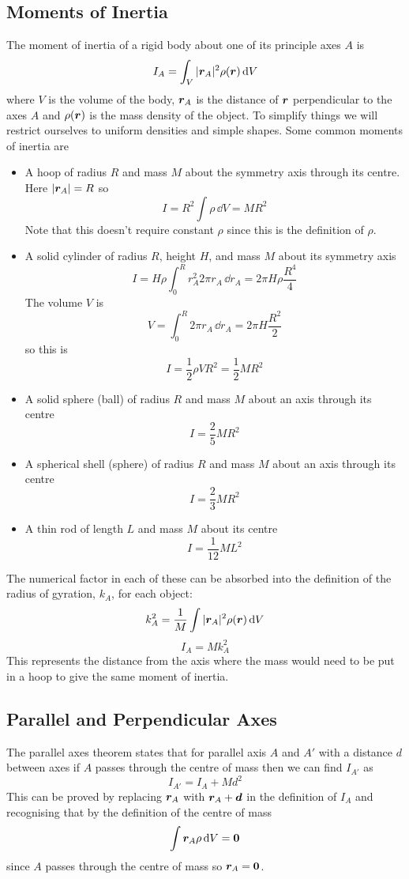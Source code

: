 \documentclass{article}
\begin{document}
    \subsection{Moments of Inertia}
    The moment of inertia of a rigid body about one of its principle axes \(A\) is
    \[I_A = \int_V|\bm{r}_A|^2\rho(\bm{r})\,\dd V\]
    where \(V\) is the volume of the body, \(\bm{r}_A\) is the distance of \(\bm{r}\) perpendicular to the axes \(A\) and \(\rho(\bm{r})\) is the mass density of the object.
    To simplify things we will restrict ourselves to uniform densities and simple shapes.
    Some common moments of inertia are
    \begin{itemize}
        \item A hoop of radius \(R\) and mass \(M\) about the symmetry axis through its centre.
        Here \(|\bm{r}_A| = R\) so
        \[I = R^2\int\rho\,\dd V = MR^2\]
        Note that this doesn't require constant \(\rho\) since this is the definition of \(\rho\).
        
        \item A solid cylinder of radius \(R\), height \(H\), and mass \(M\) about its symmetry axis
        \[I = H\rho\int_0^Rr^2_A2\pi r_A\,\dd r_A = 2\pi H\rho\frac{R^4}{4}\]
        The volume \(V\) is
        \[V = \int_0^R2\pi r_A\,\dd r_A = 2\pi H\frac{R^2}{2}\]
        so this is
        \[I = \frac{1}{2}\rho VR^2 = \frac{1}{2}MR^2\]
        
        \item A solid sphere (ball) of radius \(R\) and mass \(M\) about an axis through its centre
        \[I = \frac{2}{5}MR^2\]
        
        \item A spherical shell (sphere) of radius \(R\) and mass \(M\) about an axis through its centre
        \[I = \frac{2}{3}MR^2\]
        
        \item A thin rod of length \(L\) and mass \(M\) about its centre
        \[I = \frac{1}{12}ML^2\]
    \end{itemize}
    The numerical factor in each of these can be absorbed into the definition of the radius of gyration, \(k_A\), for each object:
    \[k_A^2 = \frac{1}{M}\int |\bm{r}_A|^2\rho(\bm{r})\,\dd V\]
    \[I_A = Mk_A^2\]
    This represents the distance from the axis where the mass would need to be put in a hoop to give the same moment of inertia.
    
    \subsection{Parallel and Perpendicular Axes}
    The parallel axes theorem states that for parallel axis \(A\) and \(A'\) with a distance \(d\) between axes if \(A\) passes through the centre of mass then we can find \(I_{A'}\) as
    \[I_{A'} = I_A + Md^2\]
    This can be proved by replacing \(\bm{r}_A\) with \(\bm{r}_A + \bm{d}\) in the definition of \(I_A\) and recognising that by the definition of the centre of mass
    \[\int\bm{r}_A\rho\,\dd V = \bm{0}\]
    since \(A\) passes through the centre of mass so \(\bm{r}_A = \bm{0}\).
    
\end{document}
